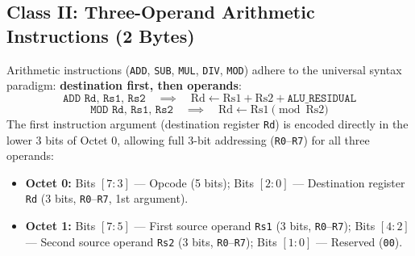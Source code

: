 \documentclass[11pt,a4paper]{article}
\newcommand{\reg}[1]{\texttt{#1}}
\newcommand{\bits}[1]{\texttt{#1}}
\begin{document}
\subsection{Class II: Three-Operand Arithmetic Instructions (2 Bytes)}
Arithmetic instructions (\texttt{ADD}, \texttt{SUB}, \texttt{MUL}, \texttt{DIV}, \texttt{MOD}) adhere to the universal syntax paradigm: \textbf{destination first, then operands}:
$$\texttt{ADD Rd, Rs1, Rs2} \quad \implies \quad \text{Rd} \leftarrow \text{Rs1} + \text{Rs2} + \reg{ALU\_RESIDUAL}$$
$$\texttt{MOD Rd, Rs1, Rs2} \quad \implies \quad \text{Rd} \leftarrow \text{Rs1} \pmod{\text{Rs2}}$$
The first instruction argument (destination register \reg{Rd}) is encoded directly in the lower 3 bits of Octet 0, allowing full 3-bit addressing (\texttt{R0}--\texttt{R7}) for all three operands:
\begin{itemize}
  \item \textbf{Octet 0:} Bits $[7:3]$ --- Opcode (5 bits); Bits $[2:0]$ --- Destination register \reg{Rd} (3 bits, \texttt{R0}--\texttt{R7}, 1st argument).
  \item \textbf{Octet 1:} Bits $[7:5]$ --- First source operand \reg{Rs1} (3 bits, \texttt{R0}--\texttt{R7}); Bits $[4:2]$ --- Second source operand \reg{Rs2} (3 bits, \texttt{R0}--\texttt{R7}); Bits $[1:0]$ --- Reserved (\bits{00}).
\end{itemize}
\end{document}

